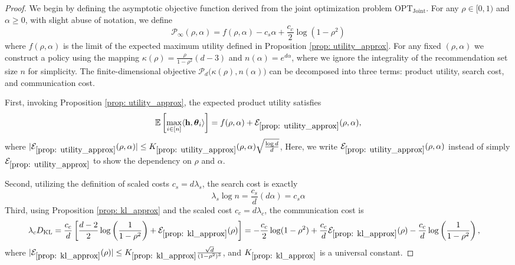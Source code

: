 \documentclass[12pt]{article}
\theoremstyle{definition}
\theoremstyle{remark}
\begin{document}
\begin{proof} We begin by defining the asymptotic objective function derived from the joint optimization problem $\mathrm{OPT}_{\mathrm{Joint}}$. For any $\rho \in [0, 1)$ and $\alpha \ge 0$, with slight abuse of notation, we define
\begin{equation*}
\mathcal{P}_\infty(\rho, \alpha) = f(\rho, \alpha) - c_s \alpha + \frac{c_c}{2} \log(1-\rho^2)
\end{equation*}
where $f(\rho, \alpha)$ is the limit of the expected maximum utility defined in Proposition \ref{prop: utility_approx}. For any fixed $(\rho, \alpha)$ we construct a policy using the mapping $\kappa(\rho) = \frac{\rho}{1-\rho^2}(d-3)$ and $n(\alpha) = e^{d\alpha}$, where we ignore the integrality of the recommendation set size $n$ for simplicity. The finite-dimensional objective $\mathcal{P}_d\big(\kappa(\rho), n(\alpha)\big)$ can be decomposed into three terms: product utility, search cost, and communication cost.

First, invoking Proposition \ref{prop: utility_approx}, the expected product utility satisfies
\begin{equation*}
    \mathbb{E}\left[\max_{i \in [n]} \langle \mathbf h, \boldsymbol \theta_i \rangle\right] = f(\rho, \alpha) + \mathcal{E}_{\ref{prop: utility_approx}}(\rho,\alpha),
\end{equation*}
where $|\mathcal{E}_{\ref{prop: utility_approx}}(\rho,\alpha)| \leq K_{\ref{prop: utility_approx}}(\rho,\alpha) \sqrt{\frac{\log d}{d}}$, Here, we write $\mathcal{E}_{\ref{prop: utility_approx}}(\rho,\alpha)$ instead of simply $\mathcal{E}_{\ref{prop: utility_approx}}$ to show the dependency on $\rho$ and $\alpha$.

Second, utilizing the definition of scaled costs $c_s = d\lambda_s$, the search cost is exactly
\begin{equation*}
    \lambda_s \log n = \frac{c_s}{d} (d \alpha) = c_s \alpha
\end{equation*}
Third, using Proposition \ref{prop: kl_approx}  and the scaled cost $c_c = d\lambda_c$, the communication cost is
\begin{align*}
    \lambda_c D_{\text{KL}} &= \frac{c_c}{d} \left[ \frac{d-2}{2} \log \left(\frac{1}{1-\rho^2}\right) + \mathcal{E}_{\ref{prop: kl_approx}}(\rho) \right] = -\frac{c_c}{2} \log(1-\rho^2) + \frac{c_c}{d}\mathcal{E}_{\ref{prop: kl_approx}}(\rho) - \frac{c_c}{d} \log \left(\frac{1}{1-\rho^2}\right),
\end{align*}
where $|\mathcal{E}_{\ref{prop: kl_approx}}(\rho)| \leq K_{\ref{prop: kl_approx}} \frac{\sqrt{d}}{(1-\rho^2)^3}$, and $K_{\ref{prop: kl_approx}}$ is a universal constant.


\end{proof}
\end{document}
